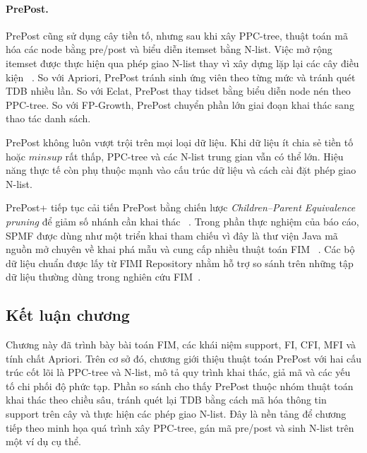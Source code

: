 \paragraph{PrePost.}
PrePost cũng sử dụng cây tiền tố, nhưng sau khi xây PPC-tree, thuật toán mã hóa
các node bằng pre/post và biểu diễn itemset bằng N-list. Việc mở rộng itemset
được thực hiện qua phép giao N-list thay vì xây dựng lặp lại các cây điều kiện
~\cite{deng2012prepost}. So với Apriori, PrePost tránh sinh ứng viên theo từng
mức và tránh quét TDB nhiều lần. So với Eclat, PrePost thay tidset bằng biểu
diễn node nén theo PPC-tree. So với FP-Growth, PrePost chuyển phần lớn giai đoạn
khai thác sang thao tác danh sách.

PrePost không luôn vượt trội trên mọi loại dữ liệu. Khi dữ liệu ít chia sẻ tiền
tố hoặc $\mathit{minsup}$ rất thấp, PPC-tree và các N-list trung gian vẫn có thể
lớn. Hiệu năng thực tế còn phụ thuộc mạnh vào cấu trúc dữ liệu và cách cài đặt
phép giao N-list.

PrePost+ tiếp tục cải tiến PrePost bằng chiến lược
\textit{Children--Parent Equivalence pruning} để giảm số nhánh cần khai thác
~\cite{deng2015prepostplus}. Trong phần thực nghiệm của báo cáo, SPMF được dùng
như một triển khai tham chiếu vì đây là thư viện Java mã nguồn mở chuyên về
khai phá mẫu và cung cấp nhiều thuật toán FIM
~\cite{fournier2014spmf,spmfwebsite}. Các bộ dữ liệu chuẩn được lấy từ FIMI
Repository nhằm hỗ trợ so sánh trên những tập dữ liệu thường dùng trong nghiên
cứu FIM~\cite{fimirepository,goethals2004fimi}.

\subsection{Kết luận chương}

Chương này đã trình bày bài toán FIM, các khái niệm support, FI, CFI, MFI và
tính chất Apriori. Trên cơ sở đó, chương giới thiệu thuật toán PrePost với hai
cấu trúc cốt lõi là PPC-tree và N-list, mô tả quy trình khai thác, giả mã và các
yếu tố chi phối độ phức tạp. Phần so sánh cho thấy PrePost thuộc nhóm thuật toán
khai thác theo chiều sâu, tránh quét lại TDB bằng cách mã hóa thông tin support
trên cây và thực hiện các phép giao N-list. Đây là nền tảng để chương tiếp theo
minh họa quá trình xây PPC-tree, gán mã pre/post và sinh N-list trên một ví dụ
cụ thể.
